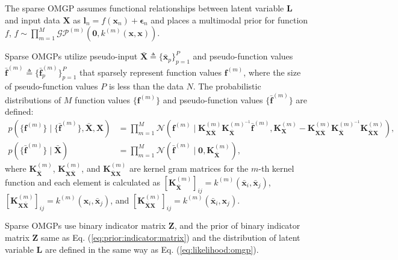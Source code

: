 \documentclass[sn-mathphys-num]{sn-jnl}
\begin{document}
The sparse OMGP assumes functional relationships between latent variable $\mathbf L$ and input data $\mathbf X$ as $\mathbf l_n = f(\mathbf x_n) + \boldsymbol{\epsilon}_n$ and places a multimodal prior for function $f$, $f \sim \prod_{m=1}^M \mathcal{GP}^{(m)}(\mathbf{0}, k^{(m)}(\mathbf{x}, \mathbf{x}))$.

Sparse OMGPs utilize pseudo-input $\bar{\mathbf X}\triangleq \{\bar{\mathbf x}_p\}_{p=1}^P$ and pseudo-function values $\bar{\mathbf f}^{(m)}\triangleq \{\bar{\mathbf f}^{(m)}_p\}_{p=1}^P$ that sparsely represent function values $\mathbf f^{(m)}$, where the size of pseudo-function values $P$ is less than the data $N$.
The probabilistic distributions of $M$ function values $\{\mathbf f^{(m)}\}$ and pseudo-function values $\{\bar{\mathbf f}^{(m)}\}$ are defined:
\begin{align}
    p(\{{\mathbf{f}}^{(m)}\}\mid\{\bar{\mathbf{f}}^{(m)}\},\bar{\mathbf{X}}, {\mathbf X}) \nonumber  &= \prod^{M}_{m=1} \mathcal{N}(\mathbf{f}^{(m)}\mid \mathbf{K}^{(m)}_{\mathbf{X}\bar{\mathbf{X}}} \mathbf{K}^{(m)^{-1}}_{\bar{\mathbf{X}}}\bar{\mathbf{f}}^{(m)}, \mathbf{K}_{\mathbf{X}}^{(m)}-\mathbf{K}^{(m)}_{\mathbf{X}\bar{\mathbf{X}}}\mathbf{K}^{(m)^{-1}}_{\bar{\mathbf{X}}}\mathbf{K}^{(m)}_{\bar{\mathbf{X}} \mathbf{X}}), \\
    p(\{\bar{\mathbf{f}}^{(m)}\}\mid \bar{\mathbf X}) &= \prod^M_{m=1} \mathcal{N}(\bar{\mathbf{f}}^{(m)}\mid \mathbf{0}, \mathbf{K}_{\bar{\mathbf{X}}}^{(m)}), 
\end{align}
where $\mathbf{K}^{(m)}_{\bar{\mathbf{X}}}$, $\mathbf{K}^{(m)}_{\mathbf{X}\bar{\mathbf{X}}}$, and $\mathbf{K}^{(m)}_{\bar{\mathbf{X}}\mathbf{X}}$ are kernel gram matrices for the $m$-th kernel function and each element is calculated as $\left[\mathbf{K}^{(m)}_{\bar{\mathbf{X}}}\right]_{ij} = k^{(m)}(\bar{\mathbf x}_i, \bar{\mathbf x}_j)$, $\left[\mathbf{K}^{(m)}_{\mathbf{X}\bar{\mathbf{X}}}\right]_{ij}= k^{(m)}(\mathbf x_i, \bar{\mathbf x}_j)$, and $\left[\mathbf{K}^{(m)}_{\bar{\mathbf{X}}\mathbf{X}}\right]_{ij}= k^{(m)}(\bar{\mathbf x}_i, \mathbf x_j)$.


Sparse OMGPs use binary indicator matrix $\mathbf Z$, and the prior of binary indicator matrix $\mathbf Z$ same as Eq. (\ref{eq:prior:indicator:matrix}) and the distribution of latent variable $\mathbf L$ are defined in the same way as  Eq. (\ref{eq:likelihood:omgp}).
\end{document}
